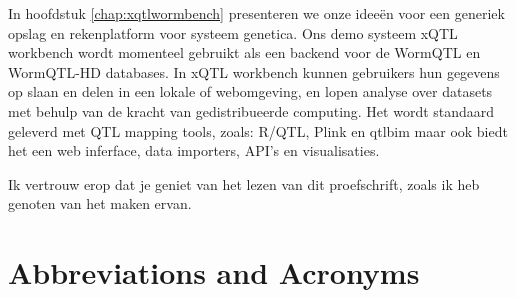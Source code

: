 In hoofdstuk \ref{chap:xqtlwormbench} presenteren we onze idee\"en voor een generiek opslag en rekenplatform 
voor systeem genetica. Ons demo systeem xQTL workbench wordt momenteel gebruikt als een 
backend voor de WormQTL en WormQTL-HD databases. In xQTL workbench kunnen gebruikers hun 
gegevens op slaan en delen in een lokale of webomgeving, en lopen analyse over datasets met 
behulp van de kracht van gedistribueerde computing. Het wordt standaard geleverd met QTL 
mapping tools, zoals: R/QTL, Plink en qtlbim maar ook biedt het een web inferface, data 
importers, API's en visualisaties.

Ik vertrouw erop dat je geniet van het lezen van dit proefschrift, zoals ik heb genoten van het maken 
ervan.

\newpage
\section{Abbreviations and Acronyms}
